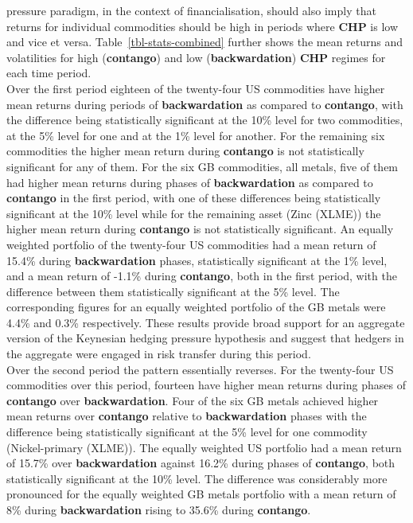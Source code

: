\documentclass[
  authoryear,
  preprint,
  3p]{elsarticle}
\begin{document}
pressure paradigm, in the context of financialisation, should also imply
that returns for individual commodities should be high in periods where
\textbf{CHP} is low and vice et versa. Table~\ref{tbl-stats-combined}
further shows the mean returns and volatilities for high
(\textbf{contango}) and low (\textbf{backwardation}) \textbf{CHP}
regimes for each time period.\\
Over the first period eighteen of the twenty-four US commodities have
higher mean returns during periods of \textbf{backwardation} as compared
to \textbf{contango}, with the difference being statistically
significant at the 10\% level for two commodities, at the 5\% level for
one and at the 1\% level for another. For the remaining six commodities
the higher mean return during \textbf{contango} is not statistically
significant for any of them. For the six GB commodities, all metals,
five of them had higher mean returns during phases of
\textbf{backwardation} as compared to \textbf{contango} in the first
period, with one of these differences being statistically significant at
the 10\% level while for the remaining asset (Zinc (XLME)) the higher
mean return during \textbf{contango} is not statistically significant.
An equally weighted portfolio of the twenty-four US commodities had a
mean return of 15.4\% during \textbf{backwardation} phases,
statistically significant at the 1\% level, and a mean return of -1.1\%
during \textbf{contango}, both in the first period, with the difference
between them statistically significant at the 5\% level. The
corresponding figures for an equally weighted portfolio of the GB metals
were 4.4\% and 0.3\% respectively. These results provide broad support
for an aggregate version of the Keynesian hedging pressure hypothesis
and suggest that hedgers in the aggregate were engaged in risk transfer
during this period.\\
Over the second period the pattern essentially reverses. For the
twenty-four US commodities over this period, fourteen have higher mean
returns during phases of \textbf{contango} over \textbf{backwardation}.
Four of the six GB metals achieved higher mean returns over
\textbf{contango} relative to \textbf{backwardation} phases with the
difference being statistically significant at the 5\% level for one
commodity (Nickel-primary (XLME)). The equally weighted US portfolio had
a mean return of 15.7\% over \textbf{backwardation} against 16.2\%
during phases of \textbf{contango}, both statistically significant at
the 10\% level. The difference was considerably more pronounced for the
equally weighted GB metals portfolio with a mean return of 8\% during
\textbf{backwardation} rising to 35.6\% during \textbf{contango}.
\end{document}
